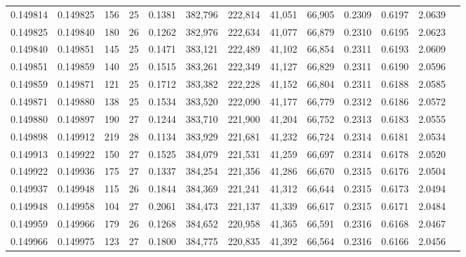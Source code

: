 \begin{tabular}{rrrrrrrrrrrrr}
0.149814 & 0.149825 & 156 &  25 &                                     0.1381 & 382,796 & 222,814 &  41,051 &  66,905 & 0.2309 & 0.6197 & 2.0639 \\
0.149825 & 0.149840 & 180 &  26 &                                     0.1262 & 382,976 & 222,634 &  41,077 &  66,879 & 0.2310 & 0.6195 & 2.0623 \\
0.149840 & 0.149851 & 145 &  25 &                                     0.1471 & 383,121 & 222,489 &  41,102 &  66,854 & 0.2311 & 0.6193 & 2.0609 \\
0.149851 & 0.149859 & 140 &  25 &                                     0.1515 & 383,261 & 222,349 &  41,127 &  66,829 & 0.2311 & 0.6190 & 2.0596 \\
0.149859 & 0.149871 & 121 &  25 &                                     0.1712 & 383,382 & 222,228 &  41,152 &  66,804 & 0.2311 & 0.6188 & 2.0585 \\
0.149871 & 0.149880 & 138 &  25 &                                     0.1534 & 383,520 & 222,090 &  41,177 &  66,779 & 0.2312 & 0.6186 & 2.0572 \\
0.149880 & 0.149897 & 190 &  27 &                                     0.1244 & 383,710 & 221,900 &  41,204 &  66,752 & 0.2313 & 0.6183 & 2.0555 \\
0.149898 & 0.149912 & 219 &  28 &                                     0.1134 & 383,929 & 221,681 &  41,232 &  66,724 & 0.2314 & 0.6181 & 2.0534 \\
0.149913 & 0.149922 & 150 &  27 &                                     0.1525 & 384,079 & 221,531 &  41,259 &  66,697 & 0.2314 & 0.6178 & 2.0520 \\
0.149922 & 0.149936 & 175 &  27 &                                     0.1337 & 384,254 & 221,356 &  41,286 &  66,670 & 0.2315 & 0.6176 & 2.0504 \\
0.149937 & 0.149948 & 115 &  26 &                                     0.1844 & 384,369 & 221,241 &  41,312 &  66,644 & 0.2315 & 0.6173 & 2.0494 \\
0.149948 & 0.149958 & 104 &  27 &                                     0.2061 & 384,473 & 221,137 &  41,339 &  66,617 & 0.2315 & 0.6171 & 2.0484 \\
0.149959 & 0.149966 & 179 &  26 &                                     0.1268 & 384,652 & 220,958 &  41,365 &  66,591 & 0.2316 & 0.6168 & 2.0467 \\
0.149966 & 0.149975 & 123 &  27 &                                     0.1800 & 384,775 & 220,835 &  41,392 &  66,564 & 0.2316 & 0.6166 & 2.0456 \\

\end{tabular}
